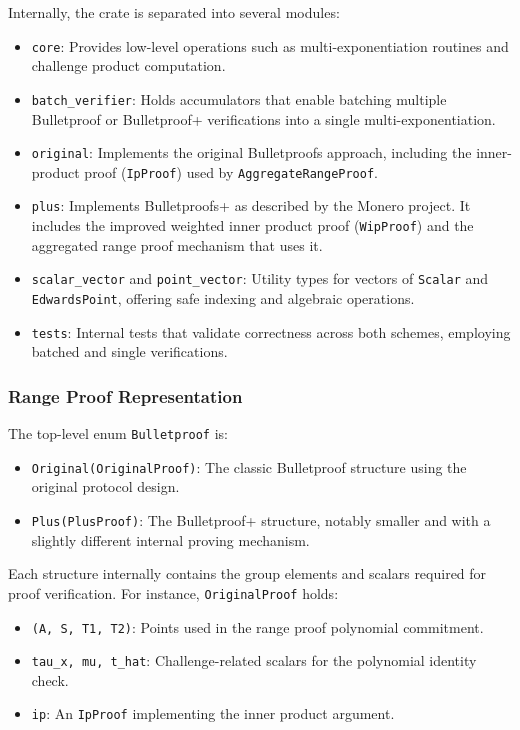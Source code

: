 Internally, the crate is separated into several modules:
\begin{itemize}
    \item \texttt{core}: Provides low-level operations such as multi-exponentiation routines and challenge product computation.  
    \item \texttt{batch\_verifier}: Holds accumulators that enable batching multiple Bulletproof or Bulletproof+ verifications into a single multi-exponentiation.  
    \item \texttt{original}: Implements the original Bulletproofs approach, including the inner-product proof (\texttt{IpProof}) used by \texttt{AggregateRangeProof}.  
    \item \texttt{plus}: Implements Bulletproofs+ as described by the Monero project.  It includes the improved weighted inner product proof (\texttt{WipProof}) and the aggregated range proof mechanism that uses it.  
    \item \texttt{scalar\_vector} and \texttt{point\_vector}: Utility types for vectors of \texttt{Scalar} and \texttt{EdwardsPoint}, offering safe indexing and algebraic operations.  
    \item \texttt{tests}: Internal tests that validate correctness across both schemes, employing batched and single verifications.  
\end{itemize}

\subsubsection{Range Proof Representation}
The top-level enum \texttt{Bulletproof} is:
\begin{itemize}
    \item \texttt{Original(OriginalProof)}: The classic Bulletproof structure using the original protocol design.  
    \item \texttt{Plus(PlusProof)}: The Bulletproof+ structure, notably smaller and with a slightly different internal proving mechanism.  
\end{itemize}

Each structure internally contains the group elements and scalars required for proof verification.  For instance, \texttt{OriginalProof} holds:
\begin{itemize}
    \item \texttt{(A, S, T1, T2)}: Points used in the range proof polynomial commitment.  
    \item \texttt{tau\_x, mu, t\_hat}: Challenge-related scalars for the polynomial identity check.  
    \item \texttt{ip}: An \texttt{IpProof} implementing the inner product argument.  
\end{itemize}

